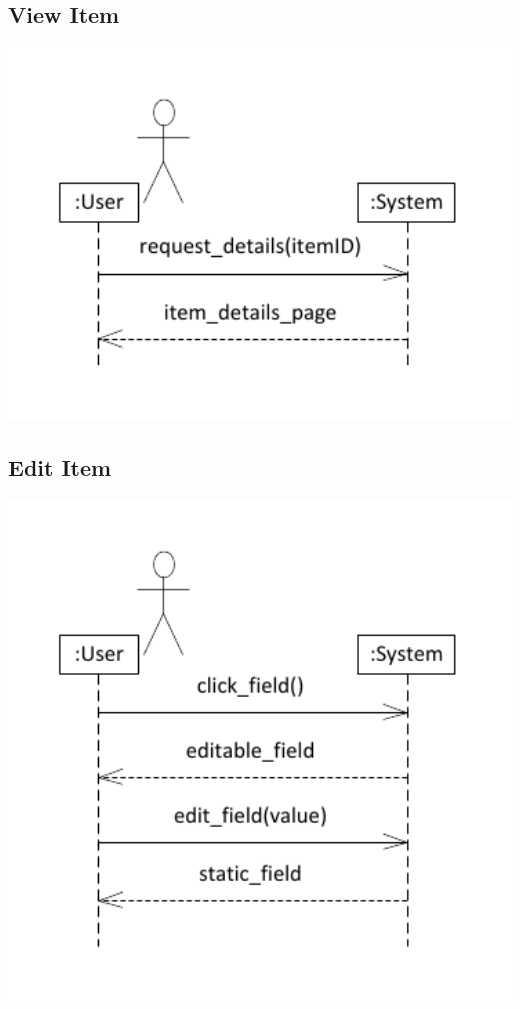 \documentclass{article}
\begin{document}
\subsection{View Item}
\includegraphics[keepaspectratio, width=6in]{ssd_view_item_details.pdf}\\
\subsection{Edit Item}
\includegraphics[keepaspectratio, width=6in]{ssd_edit_item_details.pdf}\\
\end{document}
